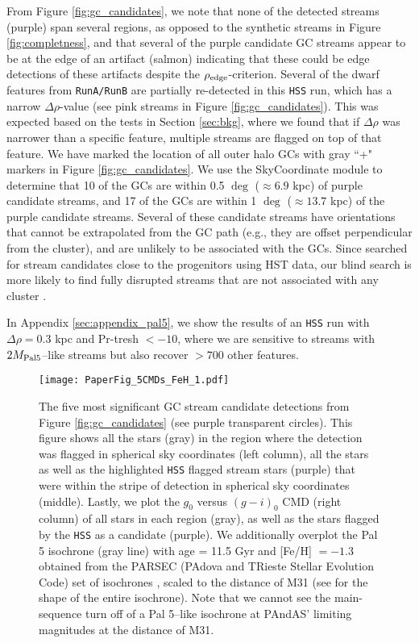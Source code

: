 \documentclass[twocolumn]{aastex631}
\begin{document}
From Figure \ref{fig:gc_candidates}, we note that none of the detected streams (purple) span several regions, as opposed to the synthetic streams in Figure \ref{fig:completness}, and that several of the purple candidate GC streams appear to be at the edge of an artifact (salmon) indicating that these could be edge detections of these artifacts despite the $\rho_{\rm edge}$-criterion. Several of the dwarf features from \texttt{RunA/RunB} are partially re-detected in this \texttt{HSS} run, which has a narrow $\Delta \rho$-value (see pink streams in Figure \ref{fig:gc_candidates}). This was expected based on the tests in Section \ref{sec:bkg}, where we found that if $\Delta \rho$ was narrower than a specific feature, multiple streams are flagged on top of that feature. We have marked the location of all outer halo GCs \citep[][]{huxor14} with gray ``+" markers in Figure \ref{fig:gc_candidates}. We use the \citet{astropy13, astropy18} SkyCoordinate module to determine that 10 of the GCs are within 0.5 $\deg$ (${\approx}6.9$ kpc) of purple candidate streams, and 17 of the GCs are within 1 $\deg$ (${\approx}13.7$ kpc) of the purple candidate streams.   Several of these candidate streams have orientations that cannot be extrapolated from the GC path (e.g., they are offset perpendicular from the cluster), and are unlikely to be associated with the GCs. Since \citet{huxor14} searched for stream candidates close to the progenitors using HST data, our blind search is more likely to find fully disrupted streams that are not associated with any cluster \citep[see also][]{balbinot18}.


In Appendix \ref{sec:appendix_pal5}, we show the results of an \texttt{HSS} run with $\Delta\rho = 0.3$ kpc and Pr-tresh $< -10$, where we are sensitive to streams with $2 {M}_{\rm Pal 5}$--like streams but also recover $>700$ other features.



\begin{figure*}
\centerline{\texttt{[image: PaperFig\_5CMDs\_FeH\_1.pdf]}}
\caption{The five most significant GC stream candidate detections from Figure \ref{fig:gc_candidates} (see purple transparent circles).  This figure shows all the stars (gray) in the region  where the detection was flagged in spherical sky coordinates (left column), all the stars as well as the highlighted \texttt{HSS} flagged stream stars (purple) that were within the stripe of detection in spherical sky coordinates (middle). Lastly, we plot the $g_0$ versus $(g-i)_0$ CMD (right column) of all stars in each region (gray), as well as the stars flagged by the \texttt{HSS} as a candidate (purple). We additionally overplot the Pal 5 isochrone (gray line)  with  age = 11.5 Gyr and [Fe/H] $= -1.3$ obtained from the PARSEC (PAdova and TRieste Stellar Evolution Code) set of isochrones \citep{bressan12}, scaled to the distance of M31 (see  for the shape of the entire isochrone).  Note that we cannot see the main-sequence turn off of a Pal 5--like isochrone at PAndAS' limiting magnitudes at the distance of M31.
}
\label{fig:cmd}
\end{figure*}
\end{document}
